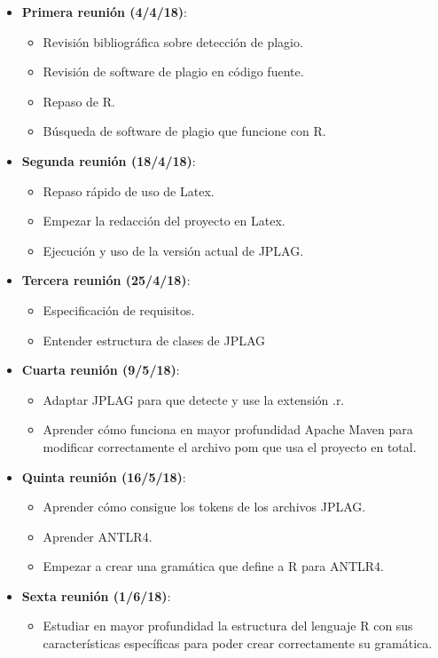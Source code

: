 \begin{itemize}
	\item \textbf{Primera reunión (4/4/18)}:
	\begin{itemize}
	\item Revisión bibliográfica sobre detección de plagio.
	\item Revisión de software de plagio en código fuente.
	\item Repaso de R.
	\item Búsqueda de software de plagio que funcione con R.
	\end{itemize}
	\item \textbf{Segunda reunión (18/4/18)}:
	\begin{itemize}
	\item Repaso rápido de uso de Latex.
	\item Empezar la redacción del proyecto en Latex.
	\item Ejecución y uso de la versión actual de JPLAG.
	\end{itemize}
	\item \textbf{Tercera reunión (25/4/18)}:
	\begin{itemize}
	\item Especificación de requisitos.
	\item Entender estructura de clases de JPLAG
	\end{itemize}
	\item \textbf{Cuarta reunión (9/5/18)}:
	\begin{itemize}
	\item Adaptar JPLAG para que detecte y use la extensión .r.
	\item Aprender cómo funciona en mayor profundidad Apache Maven para modificar correctamente el archivo pom que usa el proyecto en total.
	\end{itemize}
	\item \textbf{Quinta reunión (16/5/18)}:
	\begin{itemize}
	\item Aprender cómo consigue los tokens de los archivos JPLAG.
	\item Aprender ANTLR4.
	\item Empezar a crear una gramática que define a R para ANTLR4.
	\end{itemize}
	\item \textbf{Sexta reunión (1/6/18)}:
	\begin{itemize}
	\item Estudiar en mayor profundidad la estructura del lenguaje R con sus características específicas para poder crear correctamente su gramática.

\end{itemize}
\end{itemize}
